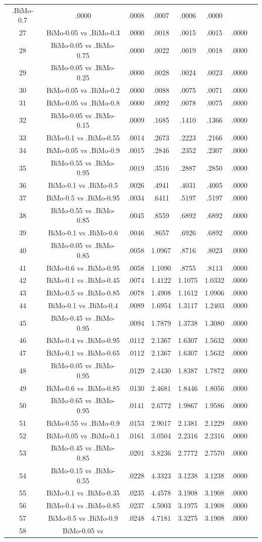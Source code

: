 \documentclass[a4paper,10pt]{article}
\begin{document}
\begin{landscape}
\begin{table}[!htp]
\begin{tabular}{cccccccc}
.BiMo-0.7&.0000&.0008&.0007&.0006&.0000\\27&BiMo-0.05 vs .BiMo-0.3&.0000&.0018&.0015&.0015&.0000\\28&BiMo-0.05 vs .BiMo-0.75&.0000&.0022&.0019&.0018&.0000\\29&BiMo-0.05 vs .BiMo-0.25&.0000&.0028&.0024&.0023&.0000\\30&BiMo-0.05 vs .BiMo-0.2&.0000&.0088&.0075&.0071&.0000\\31&BiMo-0.05 vs .BiMo-0.8&.0000&.0092&.0078&.0075&.0000\\32&BiMo-0.05 vs .BiMo-0.15&.0009&.1685&.1410&.1366&.0000\\33&BiMo-0.1 vs .BiMo-0.55&.0014&.2673&.2223&.2166&.0000\\34&BiMo-0.05 vs .BiMo-0.9&.0015&.2846&.2352&.2307&.0000\\35&BiMo-0.55 vs .BiMo-0.95&.0019&.3516&.2887&.2850&.0000\\36&BiMo-0.1 vs .BiMo-0.5&.0026&.4941&.4031&.4005&.0000\\37&BiMo-0.5 vs .BiMo-0.95&.0034&.6411&.5197&.5197&.0000\\38&BiMo-0.55 vs .BiMo-0.85&.0045&.8559&.6892&.6892&.0000\\39&BiMo-0.1 vs .BiMo-0.6&.0046&.8657&.6926&.6892&.0000\\40&BiMo-0.05 vs .BiMo-0.85&.0058&1.0967&.8716&.8023&.0000\\41&BiMo-0.6 vs .BiMo-0.95&.0058&1.1090&.8755&.8113&.0000\\42&BiMo-0.1 vs .BiMo-0.45&.0074&1.4122&1.1075&1.0332&.0000\\43&BiMo-0.5 vs .BiMo-0.85&.0078&1.4908&1.1612&1.0906&.0000\\44&BiMo-0.1 vs .BiMo-0.4&.0089&1.6954&1.3117&1.2403&.0000\\45&BiMo-0.45 vs .BiMo-0.95&.0094&1.7879&1.3738&1.3080&.0000\\46&BiMo-0.4 vs .BiMo-0.95&.0112&2.1367&1.6307&1.5632&.0000\\47&BiMo-0.1 vs .BiMo-0.65&.0112&2.1367&1.6307&1.5632&.0000\\48&BiMo-0.05 vs .BiMo-0.95&.0129&2.4430&1.8387&1.7872&.0000\\49&BiMo-0.6 vs .BiMo-0.85&.0130&2.4681&1.8446&1.8056&.0000\\50&BiMo-0.65 vs .BiMo-0.95&.0141&2.6772&1.9867&1.9586&.0000\\51&BiMo-0.55 vs .BiMo-0.9&.0153&2.9017&2.1381&2.1229&.0000\\52&BiMo-0.05 vs .BiMo-0.1&.0161&3.0504&2.2316&2.2316&.0000\\53&BiMo-0.45 vs .BiMo-0.85&.0201&3.8236&2.7772&2.7570&.0000\\54&BiMo-0.15 vs .BiMo-0.55&.0228&4.3323&3.1238&3.1238&.0000\\55&BiMo-0.1 vs .BiMo-0.35&.0235&4.4578&3.1908&3.1908&.0000\\56&BiMo-0.4 vs .BiMo-0.85&.0237&4.5003&3.1975&3.1908&.0000\\57&BiMo-0.5 vs .BiMo-0.9&.0248&4.7181&3.3275&3.1908&.0000\\58&BiMo-0.05 vs 
\end{tabular}
\end{table}
\end{landscape}
\end{document}
